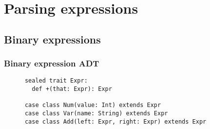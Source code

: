 \section{Parsing expressions}
\subsection{Binary expressions}

\begin{frame}[fragile]
  \frametitle{Binary expression ADT}

  \begin{definition}
    \begin{lstlisting}
      sealed trait Expr:
        def +(that: Expr): Expr
  
      case class Num(value: Int) extends Expr
      case class Var(name: String) extends Expr
      case class Add(left: Expr, right: Expr) extends Expr
    \end{lstlisting}
  \end{definition}
\end{frame}

